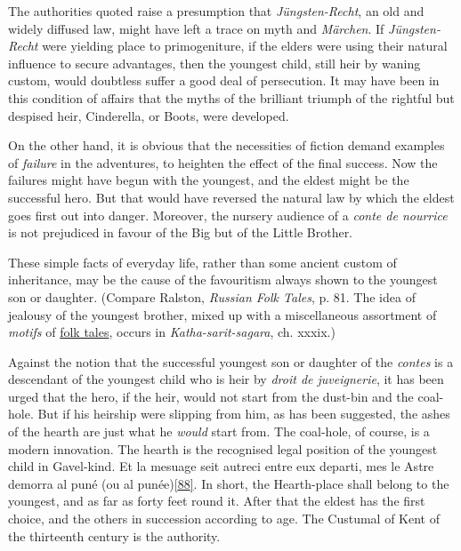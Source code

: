\documentclass[14pt,a4paper]{memoir}
\newcommand{\ul}[1]{\uline{#1}}
\begin{document}
The authorities quoted raise a presumption that \emph{Jüngsten-Recht},
an old and widely diffused law, might have left a trace on myth and
\emph{Märchen}. If \emph{Jüngsten-Recht} were yielding place to
primogeniture, if the elders were using their natural influence to
secure advantages, then the youngest child, still heir by waning custom,
would doubtless suffer a good deal of persecution. It may have been in
this condition of affairs that the myths of the brilliant triumph of the
rightful but despised heir, Cinderella, or Boots, were developed.

On the other hand, it is obvious that the necessities of fiction demand
examples of \emph{failure} in the adventures, to heighten the effect of
the final success. Now the failures might have begun with the youngest,
and the eldest might be the successful hero. But that would have
reversed the natural law by which the eldest goes first out into danger.
Moreover, the nursery audience of a \emph{conte de nourrice} is not
prejudiced in favour of the Big but of the Little Brother.

These simple facts of everyday life, rather than some ancient custom of
inheritance, may be the cause of the favouritism always shown to the
youngest son or daughter. (Compare Ralston, \emph{Russian Folk Tales},
p. 81. The idea of jealousy of the youngest brother, mixed up with a
miscellaneous assortment of \emph{motifs} of \ul{folk tales}, occurs in
\emph{Katha-sarit-sagara}, ch. xxxix.)

Against the notion that the successful youngest son or daughter of the
\emph{contes} is a descendant of the youngest child who is heir by
\emph{droit de juveignerie}, it has been urged that the hero, if the
heir, would \textquotesingle not start from the dust-bin and the
coal-hole.\textquotesingle{} But if his heirship were slipping from him,
as has been suggested, the ashes of the hearth are just what he
\emph{would} start from. The
\textquotesingle coal-hole,\textquotesingle{} of course, is a modern
innovation. The hearth is the recognised legal position of the youngest
child in Gavel-kind. \textquotesingle Et la mesuage seit autreci entre
eux departi, mes le {Astre} demorra al puné (ou al
punée)\protect\hypertarget{4533318093929944247_33931-h-1.htm.xhtmlux5cux23FNanchor_88}{}{}\protect\hyperlink{4533318093929944247_33931-h-1.htm.xhtmlux5cux23Footnote_88}{{[}88{]}}.\textquotesingle{}
In short, \textquotesingle the Hearth-place shall belong to the
youngest,\textquotesingle{} and as far as forty feet round it. After
that the eldest has the first choice, and the others in succession
according to age. The Custumal of Kent of the thirteenth century is the
authority.
\end{document}
